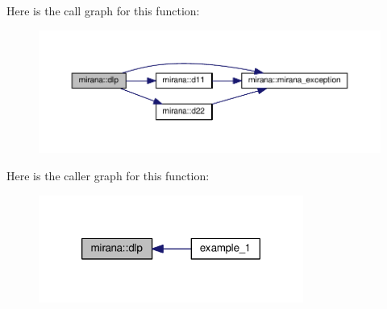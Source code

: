 Here is the call graph for this function\-:\nopagebreak
\begin{figure}[H]
\begin{center}
\leavevmode
\includegraphics[width=350pt]{classmirana_a353bce8a93046cd8fd25021634d6503e_cgraph}
\end{center}
\end{figure}




Here is the caller graph for this function\-:\nopagebreak
\begin{figure}[H]
\begin{center}
\leavevmode
\includegraphics[width=246pt]{classmirana_a353bce8a93046cd8fd25021634d6503e_icgraph}
\end{center}
\end{figure}


